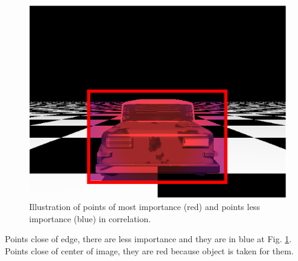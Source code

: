 \begin{figure}[H]
\includegraphics[width=\columnwidth]{images/imageErrorcontroled.eps}
\caption{Illustration of points of most importance (red) and points less importance (blue) in correlation.}
\label{fig:errorpondered}
\end{figure}

Points close of edge, there are less importance and they are in blue at Fig. \ref{fig:errorpondered}. Points close of center of image, 
they are red because object is taken for them.